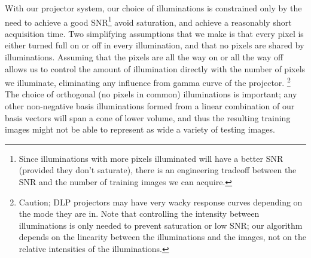 With our projector system, our choice of illuminations is constrained only by the need to achieve a good SNR\footnote{Since illuminations with more pixels illuminated will have a better SNR (provided they don't saturate), there is an engineering tradeoff between the SNR and the number of training images we can acquire.}
avoid saturation, and achieve a reasonably short acquisition time.  Two simplifying assumptions that we make is that every pixel is either turned full on or off in every illumination, and that no pixels are shared by illuminations.  Assuming that the pixels are all the way on or all the way off allows us to control the amount of illumination directly with the number of pixels we illuminate, eliminating any influence from gamma curve of the projector. \footnote{Caution; DLP projectors may have very wacky response curves depending on the mode they are in.  Note that controlling the intensity between illuminations is only needed to prevent saturation or low SNR; our algorithm depends on the linearity between the illuminations and the images, not on the relative intensities of the illuminations.} The choice of orthogonal (no pixels in common) illuminations is important; any other non-negative basis illuminations formed from a linear combination of our basis vectors will span a cone of lower volume, and thus the resulting training images might not be able to represent as wide a variety of testing images. 


